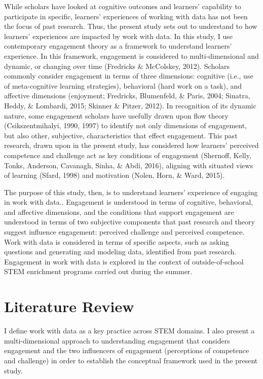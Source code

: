 \documentclass[]{book}
\theoremstyle{definition}
\theoremstyle{definition}
\theoremstyle{definition}
\theoremstyle{remark}
\begin{document}
While scholars have looked at cognitive outcomes and learners'
capability to participate in specific, learners' experiences of working
with data has not been the focus of past research. Thus, the present
study sets out to understand to how learners' experiences are impacted
by work with data. In this study, I use contemporary engagement theory
as a framework to understand learners' experience. In this framework,
engagement is considered to multi-dimensional and dynamic, or changing
over time (Fredricks \& McColskey, 2012). Scholars commonly consider
engagement in terms of three dimensions: cognitive (i.e., use of
meta-cognitive learning strategies), behavioral (hard work on a task),
and affective dimensions (enjoyment; Fredricks, Blumenfeld, \& Paris,
2004; Sinatra, Heddy, \& Lombardi, 2015; Skinner \& Pitzer, 2012). In
recognition of its dynamic nature, some engagement scholars have
usefully drawn upon flow theory (Csikszentmihalyi, 1990, 1997) to
identify not only dimensions of engagement, but also other, subjective,
characteristics that effect engagement. This past research, drawn upon
in the present study, has considered how learners' perceived competence
and challenge act as key conditions of engagement (Shernoff, Kelly,
Tonks, Anderson, Cavanagh, Sinha, \& Abdi, 2016), aligning with situated
views of learning (Sfard, 1998) and motivation (Nolen, Horn, \& Ward,
2015).

The purpose of this study, then, is to understand learners' experience
of engaging in work with data.. Engagement is understood in terms of
cognitive, behavioral, and affective dimensions, and the conditions that
support engagement are understood in terms of two subjective components
that past research and theory suggest influence engagement: perceived
challenge and perceived competence. Work with data is considered in
terms of specific aspects, such as asking questions and generating and
modeling data, identified from past research. Engagement in work with
data is explored in the context of outside-of-school STEM enrichment
programs carried out during the summer.

\chapter{Literature Review}\label{literature-review}

I define work with data as a key practice across STEM domains. I also
present a multi-dimensional approach to understanding engagement that
considers engagement and the two influencers of engagement (perceptions
of competence and challenge) in order to establish the conceptual
framework used in the present study.
\end{document}

